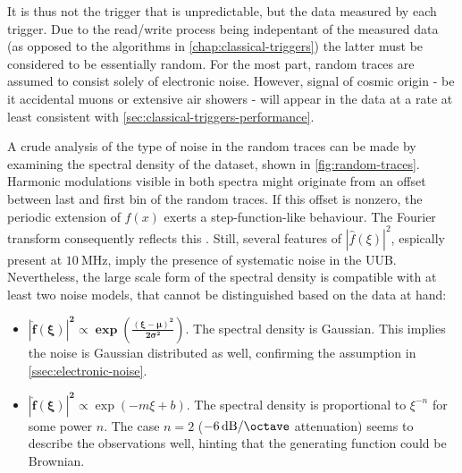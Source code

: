 It is thus not the trigger that is unpredictable, but the data measured by each trigger. Due to the read/write process being indepentant of the measured data
(as opposed to the algorithms in \autoref{chap:classical-triggers}) the latter must be considered to be essentially random. For the most part, random traces are 
assumed to consist solely of electronic noise. However, signal of cosmic origin - be it accidental muons or extensive air showers - will appear in the data at a
rate at least consistent with \autoref{sec:classical-triggers-performance}.

A crude analysis of the type of noise in the random traces can be made by examining the spectral density of the dataset, shown in \autoref{fig:random-traces}.
Harmonic modulations visible in both spectra might originate from an offset between last and first bin of the random traces. If this offset is nonzero, the 
periodic extension of $f(x)$ exerts a step-function-like behaviour. The Fourier transform consequently reflects this \cite{burrows1990fourier}. Still, several
features of $| \hat{f}(\xi) | ^{2}$, espically present at $\SI{10}{\mega\hertz}$, imply the presence of systematic noise in the UUB. Nevertheless, the large scale 
form of the spectral density is compatible with at least two noise models, that cannot be distinguished based on the data at hand:

\begin{itemize}
	\item  $\mathbf{| \hat{f}(\xi) | ^{2} \propto \exp\left(\frac{(\xi - \mu)^2}{2\sigma^2}\right)}$. The spectral density is Gaussian. This implies the noise is 
	Gaussian distributed as well, confirming the assumption in \autoref{ssec:electronic-noise}.
	\item $\mathbf{| \hat{f}(\xi) | ^{2} \propto} \exp\left(-m\xi + b\right)$. The spectral density is proportional to $\xi^{-n}$ for some power $n$. The case 
    $n = 2$ ($\SI[per-mode=symbol]{-6}{\deci\bel\per\octave}$ attenuation) seems to describe the observations well, hinting that the generating function could be 
    Brownian.

\end{itemize}

